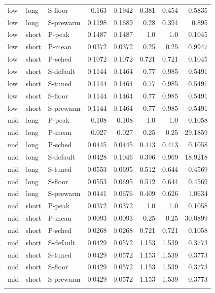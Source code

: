 \begin{table}[htbp]
\begin{tabular}{lllrrrrr}
low & long & S-floor & 0.163 & 0.1942 & 0.381 & 0.454 & 0.5835 \\
low & long & S-prewarm & 0.1198 & 0.1689 & 0.28 & 0.394 & 0.895 \\
low & short & P-peak & 0.1487 & 0.1487 & 1.0 & 1.0 & 0.1045 \\
low & short & P-mean & 0.0372 & 0.0372 & 0.25 & 0.25 & 0.9947 \\
low & short & P-sched & 0.1072 & 0.1072 & 0.721 & 0.721 & 0.1045 \\
low & short & S-default & 0.1144 & 0.1464 & 0.77 & 0.985 & 0.5491 \\
low & short & S-tuned & 0.1144 & 0.1464 & 0.77 & 0.985 & 0.5491 \\
low & short & S-floor & 0.1144 & 0.1464 & 0.77 & 0.985 & 0.5491 \\
low & short & S-prewarm & 0.1144 & 0.1464 & 0.77 & 0.985 & 0.5491 \\
mid & long & P-peak & 0.108 & 0.108 & 1.0 & 1.0 & 0.1058 \\
mid & long & P-mean & 0.027 & 0.027 & 0.25 & 0.25 & 29.1859 \\
mid & long & P-sched & 0.0445 & 0.0445 & 0.413 & 0.413 & 0.1058 \\
mid & long & S-default & 0.0428 & 0.1046 & 0.396 & 0.969 & 18.9218 \\
mid & long & S-tuned & 0.0553 & 0.0695 & 0.512 & 0.644 & 0.4569 \\
mid & long & S-floor & 0.0553 & 0.0695 & 0.512 & 0.644 & 0.4569 \\
mid & long & S-prewarm & 0.0441 & 0.0676 & 0.409 & 0.626 & 1.0634 \\
mid & short & P-peak & 0.0372 & 0.0372 & 1.0 & 1.0 & 0.1058 \\
mid & short & P-mean & 0.0093 & 0.0093 & 0.25 & 0.25 & 30.0899 \\
mid & short & P-sched & 0.0268 & 0.0268 & 0.721 & 0.721 & 0.1058 \\
mid & short & S-default & 0.0429 & 0.0572 & 1.153 & 1.539 & 0.3773 \\
mid & short & S-tuned & 0.0429 & 0.0572 & 1.153 & 1.539 & 0.3773 \\
mid & short & S-floor & 0.0429 & 0.0572 & 1.153 & 1.539 & 0.3773 \\
mid & short & S-prewarm & 0.0429 & 0.0572 & 1.153 & 1.539 & 0.3773 \\
\botrule
\end{tabular}
\end{table}

